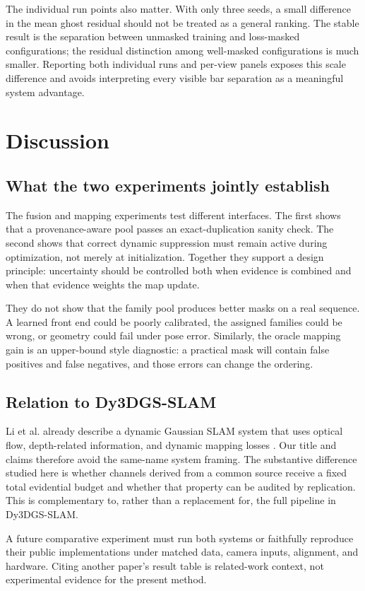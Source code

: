 \documentclass[10pt,conference]{IEEEtran}
\begin{document}
The individual run points also matter. With only three seeds, a small difference in the mean ghost residual should not be treated as a general ranking. The stable result is the separation between unmasked training and loss-masked configurations; the residual distinction among well-masked configurations is much smaller. Reporting both individual runs and per-view panels exposes this scale difference and avoids interpreting every visible bar separation as a meaningful system advantage.

\section{Discussion}
\subsection{What the two experiments jointly establish}
The fusion and mapping experiments test different interfaces. The first shows that a provenance-aware pool passes an exact-duplication sanity check. The second shows that correct dynamic suppression must remain active during optimization, not merely at initialization. Together they support a design principle: uncertainty should be controlled both when evidence is combined and when that evidence weights the map update.

They do not show that the family pool produces better masks on a real sequence. A learned front end could be poorly calibrated, the assigned families could be wrong, or geometry could fail under pose error. Similarly, the oracle mapping gain is an upper-bound style diagnostic: a practical mask will contain false positives and false negatives, and those errors can change the ordering.

\subsection{Relation to Dy3DGS-SLAM}
Li et al. already describe a dynamic Gaussian SLAM system that uses optical flow, depth-related information, and dynamic mapping losses \cite{li2025dy3dgs}. Our title and claims therefore avoid the same-name system framing. The substantive difference studied here is whether channels derived from a common source receive a fixed total evidential budget and whether that property can be audited by replication. This is complementary to, rather than a replacement for, the full pipeline in Dy3DGS-SLAM.

A future comparative experiment must run both systems or faithfully reproduce their public implementations under matched data, camera inputs, alignment, and hardware. Citing another paper's result table is related-work context, not experimental evidence for the present method.
\end{document}
